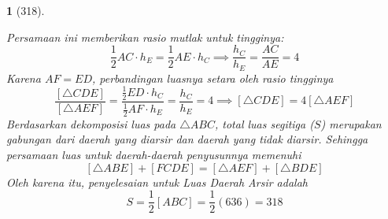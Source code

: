 \documentclass[11pt,a4paper,DIV=12]{scrartcl}
\theoremstyle{problemstyle}
\theoremstyle{answerstyle}
\newtheorem{answer}{}
\begin{document}
\begin{answer}[318]
\begin{center}
  \end{center}
  Persamaan ini memberikan rasio mutlak untuk tingginya:
  $$ \frac{1}{2} AC \cdot h_E = \frac{1}{2} AE \cdot h_C \implies \frac{h_C}{h_E} = \frac{AC}{AE} = 4 $$
  Karena $AF = ED$, perbandingan luasnya setara oleh rasio tingginya
  $$ \frac{[\triangle CDE]}{[\triangle AEF]} = \frac{\frac{1}{2} ED \cdot h_C}{\frac{1}{2} AF \cdot h_E} = \frac{h_C}{h_E} = 4 \implies [\triangle CDE] = 4[\triangle AEF] $$
  Berdasarkan dekomposisi luas pada $\triangle ABC$, total luas segitiga ($S$) merupakan gabungan dari daerah yang diarsir dan daerah yang tidak diarsir. Sehingga persamaan luas untuk daerah-daerah penyusunnya memenuhi
  $$ [\triangle ABE] + [FCDE] = [\triangle AEF] + [\triangle BDE] $$
  Oleh karena itu, penyelesaian untuk Luas Daerah Arsir adalah
  $$ S = \frac{1}{2} [ABC] = \frac{1}{2} (636) = \boxed{318} $$
\end{answer}
\end{document}
